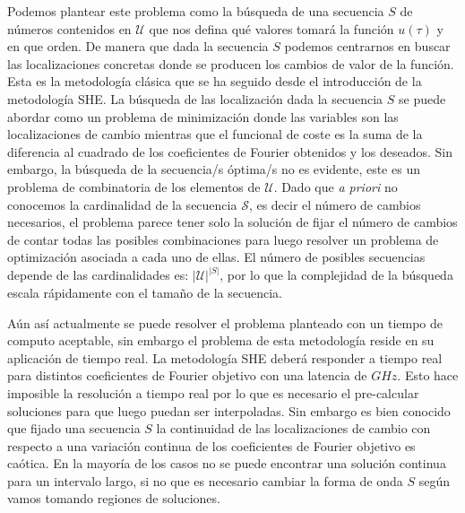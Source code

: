 

Podemos plantear este problema como  la búsqueda de una secuencia $S$ de números contenidos en $\mathcal{U}$ que nos defina qué valores tomará la función $u(\tau)$ y en que orden.
%
De manera que dada la secuencia $S$ podemos centrarnos en buscar las localizaciones concretas donde se producen los cambios de valor de la función.
%
Esta es la metodología clásica que se ha seguido desde el introducción de la metodología SHE.
%
La búsqueda de las localización dada la secuencia $S$ se puede abordar como un problema de minimización donde las variables son las localizaciones de cambio mientras que el funcional de coste es la suma de la diferencia al cuadrado de los coeficientes de Fourier obtenidos y los deseados.
%
Sin embargo, la búsqueda de la secuencia/s óptima/s no es evidente, este es un problema de combinatoria de los elementos de $\mathcal{U}$. 
%
Dado que \emph{a priori} no conocemos la cardinalidad de la secuencia $\mathcal{S}$, es decir el número de cambios necesarios,  el problema parece tener solo la solución de fijar el número de cambios de contar todas las posibles combinaciones para luego resolver un problema de optimización asociada a cada uno de ellas. 
%  
El número de posibles secuencias depende de las cardinalidades es:  $|\mathcal{U}|^{|S|}$, por lo que la complejidad de la búsqueda escala rápidamente con el tamaño de la secuencia.
\newline 



Aún así actualmente se puede resolver el problema planteado con un tiempo de computo aceptable, sin embargo el problema de esta metodología reside en su aplicación de tiempo real.
%
La metodología SHE deberá responder a tiempo real para distintos coeficientes de Fourier objetivo con una latencia de $GHz$. 
%
Esto hace imposible la resolución a tiempo real por lo que es necesario el pre-calcular soluciones para que luego puedan ser interpoladas.
%
Sin embargo es bien conocido que fijado una secuencia $S$ la continuidad de las localizaciones de cambio con respecto a una variación continua de los coeficientes de Fourier objetivo es caótica. 
%
En la mayoría de los casos no se puede encontrar una solución continua para un intervalo largo, si no que es necesario cambiar la forma de onda $S$ según vamos tomando regiones de soluciones.
\newline

